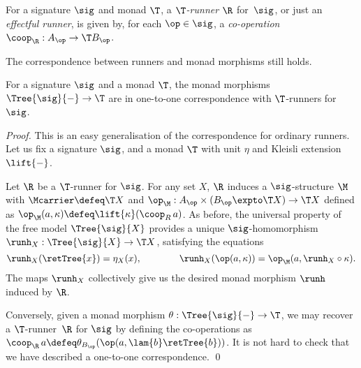 \begin{definition}
  For a signature $\sig$ and monad $\T$, a \emph{$\T$-runner $\R$} for~$\sig$, 
  or just an \emph{effectful runner}, 
  is given by, for each $\op \in \sig$, a \emph{co-operation}
  $\coop_\R : A_\op \to \T B_\op$.
\end{definition}

The correspondence between runners and monad morphisms still holds.

\begin{proposition}
  \label{prop:monadmorphism}
  For a signature $\sig$ and a monad $\T$, the monad morphisms $\Tree{\sig}{{-}} \to \T$
  are in one-to-one correspondence with $\T$-runners for~$\sig$.
\end{proposition}

\begin{proof}
  This is an easy generalisation of the correspondence for 
  ordinary runners. Let us fix a signature $\sig$, and a monad $\T$ 
  with unit $\eta$ and Kleisli extension $\lift{{-}}$.

  Let $\R$ be a $\T$-runner for $\sig$. For any set $X$, $\R$ induces a $\sig$-structure
  $\M$ with $\Mcarrier \defeq \T X$ and 
  $\op_\M : A_\op \times (B_\op \expto \T X) \to \T X$ defined as
  $
    \op_\M (a, \kappa) \defeq \lift{\kappa} (\coop_R\,a)
  $.
  As before, the universal property of the free model $\Tree{\sig}{X}$ provides a unique
  $\sig$-homomorphism $\runh_X : \Tree{\sig}{X} \to \T X$, satisfying the equations
  \begin{equation*}
    \runh_X (\retTree{x}) = \eta_X(x),
    \qquad\qquad
    \runh_X (\op(a, \kappa)) = \op_\M (a, \runh_X \circ \kappa).
  \end{equation*}
  The maps $\runh_X$ collectively give us the desired monad morphism $\runh$ induced by $\R$.
  
  Conversely, given a monad morphism $\theta : \Tree{\sig}{{-}} \to \T$, we may recover a
  $\T$-runner~$\R$ for $\sig$ by defining the co-operations as
  $
    \coop_\R \, a \defeq \theta_{B_\op} (\op (a, \lam{b} \retTree{b}))
  $.
  It is not hard to check that we have described a one-to-one correspondence.
  \qed
\end{proof}



